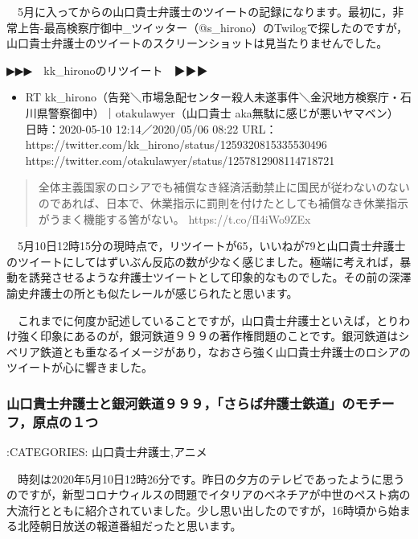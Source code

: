 \documentclass[]{ltjarticle}
\providecommand{\tightlist}{%
  \setlength{\itemsep}{0pt}\setlength{\parskip}{0pt}}
\begin{document}
　5月に入ってからの山口貴士弁護士のツイートの記録になります。最初に，非常上告-最高検察庁御中\_ツイッター（@s\_hirono）のTwilogで探したのですが，山口貴士弁護士のツイートのスクリーンショットは見当たりませんでした。

▶▶▶　kk\_hironoのリツイート　▶▶▶

\begin{itemize}
\tightlist
\item
  RT
  kk\_hirono（告発＼市場急配センター殺人未遂事件＼金沢地方検察庁・石川県警察御中）｜otakulawyer（山口貴士
  aka無駄に感じが悪いヤマベン） 日時：2020-05-10 12:14／2020/05/06 08:22
  URL： https://twitter.com/kk\_hirono/status/1259320815335530496
  https://twitter.com/otakulawyer/status/1257812908114718721
\end{itemize}

\begin{quote}
全体主義国家のロシアでも補償なき経済活動禁止に国民が従わないのないのであれば、日本で、休業指示に罰則を付けたとしても補償なき休業指示がうまく機能する筈がない。
https://t.co/fI4iWo9ZEx
\end{quote}

　5月10日12時15分の現時点で，リツイートが65，いいねが79と山口貴士弁護士のツイートにしてはずいぶん反応の数が少なく感じました。極端に考えれば，暴動を誘発させるような弁護士ツイートとして印象的なものでした。その前の深澤諭史弁護士の所とも似たレールが感じられたと思います。

　これまでに何度か記述していることですが，山口貴士弁護士といえば，とりわけ強く印象にあるのが，銀河鉄道９９９の著作権問題のことです。銀河鉄道はシベリア鉄道とも重なるイメージがあり，なおさら強く山口貴士弁護士のロシアのツイートが心に響きました。

\hypertarget{ux5c71ux53e3ux8cb4ux58ebux5f01ux8b77ux58ebux3068ux9280ux6cb3ux9244ux9053uxff19uxff19uxff19ux3055ux3089ux3070ux5f01ux8b77ux58ebux9244ux9053ux306eux30e2ux30c1ux30fcux30d5ux539fux70b9ux306euxff11ux3064}{%
\subsubsection{山口貴士弁護士と銀河鉄道９９９，「さらば弁護士鉄道」のモチーフ，原点の１つ}\label{ux5c71ux53e3ux8cb4ux58ebux5f01ux8b77ux58ebux3068ux9280ux6cb3ux9244ux9053uxff19uxff19uxff19ux3055ux3089ux3070ux5f01ux8b77ux58ebux9244ux9053ux306eux30e2ux30c1ux30fcux30d5ux539fux70b9ux306euxff11ux3064}}

:CATEGORIES: 山口貴士弁護士,アニメ

　時刻は2020年5月10日12時26分です。昨日の夕方のテレビであったように思うのですが，新型コロナウィルスの問題でイタリアのベネチアが中世のペスト病の大流行とともに紹介されていました。少し思い出したのですが，16時頃から始まる北陸朝日放送の報道番組だったと思います。
\end{document}
